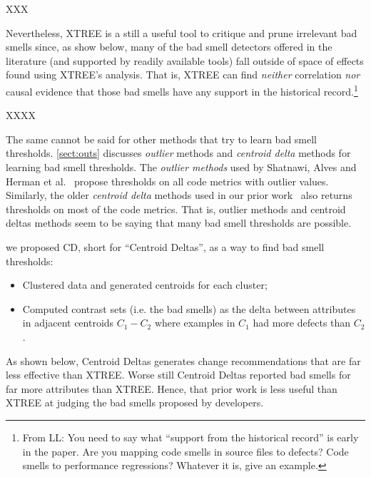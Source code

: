 \documentclass{sig-alternate}
\newcommand{\tion}[1]{\textsection\ref{sect:#1}}
\begin{document}
XXX


Nevertheless, XTREE is a still a useful tool to critique and prune
irrelevant bad smells since, 
as show below, many of the bad smell detectors offered
in the literature (and supported by readily available tools)
fall outside of  space of
effects found  using XTREE's analysis.
That is,   XTREE can find 
{\em neither} correlation {\em nor}
causal evidence that those bad smells
have any support   in the historical record.\footnote{From LL: You need to say what ``support from the historical record'' is early in the paper. Are you mapping code smells in source files to defects? Code smells to performance regressions? Whatever it is, give an example.} 

XXXX

The same cannot be said for other methods that try to learn
bad smell thresholds. \tion{outs}
discusses {\em outlier} methods and {\em centroid delta} methods
for learning bad smell thresholds.
The {\em  outlier methods}  used by
Shatnawi, Alves and Herman et al.~\cite{Shatnawi10,Alves2010,hermans15}
propose thresholds on all code metrics with outlier values.
Similarly, the older {\em centroid delta} methods  used in our 
prior work~\cite{me12c} also returns thresholds on most of the code
metrics. That is, outlier methods and centroid deltas methods
seem to be saying that many bad smell thresholds are possible.


we proposed CD, short for
``Centroid Deltas'', as a way to find bad smell thresholds:
\begin{itemize}
    \item Clustered
data and generated centroids for each cluster;
\item Computed contrast sets (i.e. the bad smells)
as the delta between attributes in adjacent centroids $C_1 - C_2$
where examples in $C_1$ had more defects than $C_2$.
\end{itemize}
As shown below, Centroid Deltas
generates change
recommendations that are far less effective than XTREE.
Worse still Centroid Deltas reported bad smells
for far more attributes than XTREE. Hence, that prior work
is less useful than XTREE at judging the  bad smells proposed by developers.

 
\end{document}
